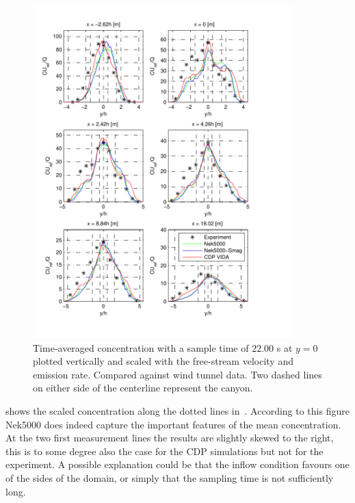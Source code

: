 \begin{figure}[h]
    \centering
    \includegraphics[width=0.9\textwidth]{Figures/NekcH_all.pdf}
    \caption{Time-averaged concentration with a sample time of $22.00$ s at $y = 0$ plotted
    vertically and scaled 
    with the free-stream velocity and emission rate. Compared against wind tunnel data.
Two dashed lines on either side of the centerline represent the canyon.}
    \label{fig:cHall}
\end{figure}

 shows the scaled concentration along the dotted lines in~. 
According to this figure Nek5000 does indeed capture the important features of the mean concentration.
At the two first measurement lines the results are slightly skewed to the right, this is to some degree 
also the case for the CDP simulations but not for the experiment. A possible explanation could be that 
the inflow condition favours one of the sides of the domain, or simply that the sampling time is not 
sufficiently long. 

